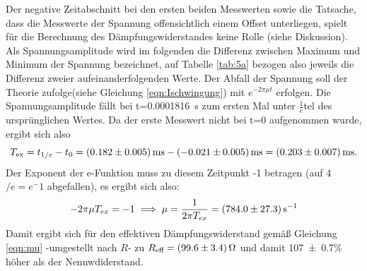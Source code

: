 Der negative Zeitabschnitt bei den ersten beiden Messwerten
sowie die Tatsache, dass
die Messwerte der Spannung
offensichtlich einem Offset unterliegen,
spielt für die Berechnung des Dämpfungswiderstandes keine Rolle
(siehe Diskussion).
Als Spannungsamplitude wird im folgenden die Differenz zwischen Maximum und
Minimum der Spannung bezeichnet, auf Tabelle
\ref{tab:5a} bezogen also jeweils die
Differenz zweier aufeinanderfolgenden Werte.
Der Abfall der Spannung soll der Theorie
zufolge(siehe Gleichung \ref{eqn:Ischwingung})
mit $e^{-2\pi\mu t}$ erfolgen. Die Spannungsamplitude fällt bei t=\SI{0.0001816}
{\second} zum ersten Mal unter
$\frac{1}{e}$tel des ursprünglichen Wertes.
Da der erste Messwert
nicht bei t=0 aufgenommen wurde, ergibt sich also
\begin{equation}
T_\text{ex} = t_{1/e} - t_0 = \SI{0.182 +- 0.005}{\milli\second}
- \SI{-0.021+-0.005}{\milli\second}=\SI{0.203 +- 0.007}{\milli\second}.
\end{equation}
Der Exponent der e-Funktion muss zu diesem Zeitpunkt -1 betragen (auf 4$/e=e^-1$
abgefallen), es ergibt sich also:
\begin{equation}
  -2\pi\mu T_{ex} = -1 \\
  \implies \mu = \frac{1}{2\pi T_{ex}} =  \SI{784.0 +- 27.3}{\per\second}
\end{equation}
Damit ergibt sich für den effektiven Dämpfungswiderstand gemäß
Gleichung \ref{eqn:mu} -umgestellt nach $R$- zu $R_\text{eff}= \SI{99.6+-3.4}{\ohm}$
und damit \num{107+-0.7}\% höher als der Nennwdiderstand.
